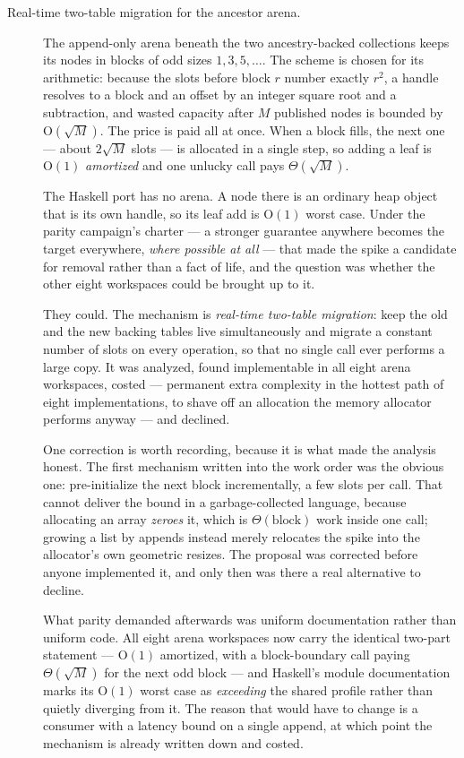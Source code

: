 \documentclass[11pt,twoside,openright]{book}
\newcommand{\term}[1]{\textit{#1}}
\newcommand{\bigoh}[1]{$\mathrm{O}(#1)$}
\begin{document}
\begin{description}
\item[Real-time two-table migration for the ancestor arena.] The append-only
arena beneath the two ancestry-backed collections keeps its nodes in blocks of
odd sizes $1, 3, 5, \ldots$. The scheme is chosen for its arithmetic: because
the slots before block $r$ number exactly $r^2$, a handle resolves to a block
and an offset by an integer square root and a subtraction, and wasted capacity
after $M$ published nodes is bounded by \bigoh{\sqrt{M}}. The price is paid all
at once. When a block fills, the next one --- about $2\sqrt{M}$ slots --- is
allocated in a single step, so adding a leaf is \bigoh{1} \emph{amortized} and
one unlucky call pays $\Theta(\sqrt{M})$.

The Haskell port has no arena. A node there is an ordinary heap object that is
its own handle, so its leaf add is \bigoh{1} worst case. Under the parity
campaign's charter --- a stronger guarantee anywhere becomes the target
everywhere, \emph{where possible at all} --- that made the spike a candidate for
removal rather than a fact of life, and the question was whether the other eight
workspaces could be brought up to it.

They could. The mechanism is \term{real-time two-table
migration}: keep the old and the new backing tables
live simultaneously and migrate a constant number of slots on every operation,
so that no single call ever performs a large copy. It was analyzed, found
implementable in all eight arena workspaces, costed --- permanent extra
complexity in the hottest path of eight implementations, to shave off an
allocation the memory allocator performs anyway --- and declined.

One correction is worth recording, because it is what made the analysis honest.
The first mechanism written into the work order was the obvious one:
pre-initialize the next block incrementally, a few slots per call. That cannot
deliver the bound in a garbage-collected language, because allocating an array
\emph{zeroes} it, which is $\Theta(\text{block})$ work inside one call; growing a
list by appends instead merely relocates the spike into the allocator's own
geometric resizes. The proposal was corrected before anyone implemented it, and
only then was there a real alternative to decline.

What parity demanded afterwards was uniform documentation rather than uniform
code. All eight arena workspaces now carry the identical two-part statement ---
\bigoh{1} amortized, with a block-boundary call paying $\Theta(\sqrt{M})$ for the
next odd block --- and Haskell's module documentation marks its \bigoh{1} worst
case as \emph{exceeding} the shared profile rather than quietly diverging from
it. The reason that would have to change is a consumer with a latency bound on a
single append, at which point the mechanism is already written down and costed.
\end{description}
\end{document}
